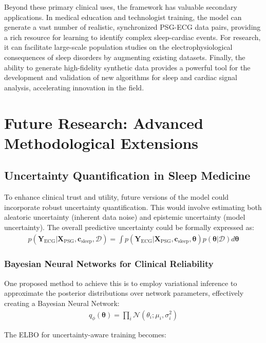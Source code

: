 \documentclass[10pt, conference]{IEEEtran}
\begin{document}
Beyond these primary clinical uses, the framework has valuable secondary applications. In medical education and technologist training, the model can generate a vast number of realistic, synchronized PSG-ECG data pairs, providing a rich resource for learning to identify complex sleep-cardiac events. For research, it can facilitate large-scale population studies on the electrophysiological consequences of sleep disorders by augmenting existing datasets. Finally, the ability to generate high-fidelity synthetic data provides a powerful tool for the development and validation of new algorithms for sleep and cardiac signal analysis, accelerating innovation in the field.

\section{Future Research: Advanced Methodological Extensions}

\subsection{Uncertainty Quantification in Sleep Medicine}

To enhance clinical trust and utility, future versions of the model could incorporate robust uncertainty quantification. This would involve estimating both aleatoric uncertainty (inherent data noise) and epistemic uncertainty (model uncertainty). The overall predictive uncertainty could be formally expressed as:
\begin{align}
p(\mathbf{Y}_{\text{ECG}} | \mathbf{X}_{\text{PSG}}, \mathbf{c}_{\text{sleep}}, \mathcal{D}) = \int p(\mathbf{Y}_{\text{ECG}} | \mathbf{X}_{\text{PSG}}, \mathbf{c}_{\text{sleep}}, \boldsymbol{\theta}) p(\boldsymbol{\theta} | \mathcal{D}) d\boldsymbol{\theta}
\end{align}

\subsubsection{Bayesian Neural Networks for Clinical Reliability}
One proposed method to achieve this is to employ variational inference to approximate the posterior distributions over network parameters, effectively creating a Bayesian Neural Network:
\begin{align}
q_\phi(\boldsymbol{\theta}) = \prod_i \mathcal{N}(\theta_i; \mu_i, \sigma_i^2)
\end{align}

The ELBO for uncertainty-aware training becomes:
\end{document}
